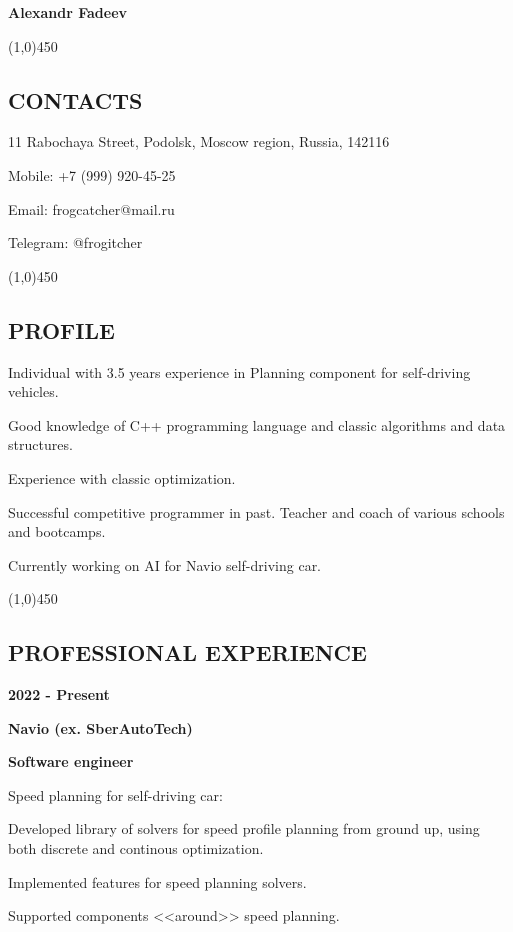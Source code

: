 \documentclass[a4paper,12pt,preview]{report}
\newcommand{\hr}{\begin{center} \line(1,0){450} \end{center}}
\begin{document}
\begin{center}
    \Huge \textbf{Alexandr Fadeev}
\end{center}

\hr

\subsection*{CONTACTS}

11 Rabochaya Street, Podolsk, Moscow region, Russia, 142116

Mobile: +7 (999) 920-45-25

Email: frogcatcher@mail.ru

Telegram: @frogitcher

\hr

\subsection*{PROFILE}

Individual with 3.5 years experience in Planning component for self-driving vehicles. 

Good knowledge of C++ programming language and classic algorithms and data structures. 

Experience with classic optimization.

Successful competitive programmer in past. Teacher and coach of various schools and bootcamps.

Currently working on AI for Navio self-driving car.

\hr

 
\subsection*{PROFESSIONAL EXPERIENCE}

\begin{multicols}{2}
    \textbf{2022 - Present} 

    \columnbreak

    \textbf{Navio (ex. SberAutoTech)}

    \textbf{Software engineer}
\end{multicols}

\begin{minipage}[c]{0.30\linewidth}
    Speed planning for self-driving car:
\end{minipage}
\hfill
\begin{minipage}[c]{0.60\linewidth}
	Developed library of solvers for speed profile planning from ground up, using both discrete and continous optimization.
	
	Implemented features for speed planning solvers.
	
	Supported components <<around>> speed planning. 
	
\end{minipage}
\end{document}
